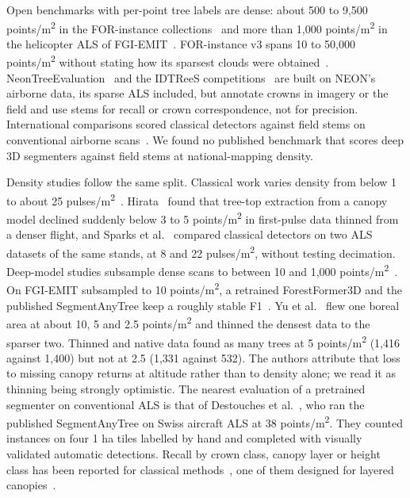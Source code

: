 \documentclass[journal]{IEEEtran}
\begin{document}
Open benchmarks with per-point tree labels are dense: about 500 to 9,500
points/m\textsuperscript{2} in the FOR-instance collections~\cite{puliti2023forinstance} and more than
1,000 points/m\textsuperscript{2} in the helicopter ALS of FGI-EMIT~\cite{ruoppa2026benchmarking}.
FOR-instance v3 spans 10 to 50,000 points/m\textsuperscript{2} without stating how its sparsest
clouds were obtained~\cite{wielgosz2026segmentanytreev2}. NeonTreeEvaluation~\cite{weinstein2021benchmark} and the IDTReeS competitions~\cite{marconi2019data,graves2023data} are built on NEON's airborne data, its sparse ALS included, but
annotate crowns in imagery or the field and use stems for recall or crown
correspondence, not for precision. International comparisons scored classical
detectors against field stems on conventional airborne scans~\cite{kaartinen2012international,vauhkonen2012comparative,eysn2015benchmark,wang2016international}. We found no published benchmark that scores deep 3D
segmenters against field stems at national-mapping density.

Density studies follow the same split. Classical work varies density from below
1 to about 25 pulses/m\textsuperscript{2}~\cite{hirata2004effects,jakubowski2013tradeoffs,kaartinen2012international,sparks2022crosscomparison}. Hirata~\cite{hirata2004effects}
found that tree-top extraction from a canopy model declined suddenly below 3 to
5 points/m\textsuperscript{2} in first-pulse data thinned from a denser flight, and
Sparks et al.~\cite{sparks2022crosscomparison} compared classical detectors on two ALS datasets of
the same stands, at 8 and 22 pulses/m\textsuperscript{2}, without testing decimation. Deep-model
studies subsample dense scans to between 10 and 1,000 points/m\textsuperscript{2}~\cite{wielgosz2024segmentanytree,xiang2025forestformer3d}. On FGI-EMIT subsampled
to 10 points/m\textsuperscript{2}, a retrained ForestFormer3D and the published SegmentAnyTree
keep a roughly stable F1~\cite{ruoppa2026benchmarking}. Yu et al.~\cite{yu2004effects} flew one
boreal area at about 10, 5 and 2.5 points/m\textsuperscript{2} and thinned the densest data to the
sparser two. Thinned and native data found as many trees at 5 points/m\textsuperscript{2} (1,416
against 1,400) but not at 2.5 (1,331 against 532). The authors attribute that
loss to missing canopy returns at altitude rather than to density alone; we read
it as thinning being strongly optimistic. The nearest evaluation of a pretrained
segmenter on conventional ALS is that of Destouches et al.~\cite{destouches2026weaklysupervised}, who
ran the published SegmentAnyTree on Swiss aircraft ALS at 38 points/m\textsuperscript{2}. They
counted instances on four 1 ha tiles labelled by hand and completed with
visually validated automatic detections. Recall by crown class, canopy layer or
height class has been reported for classical methods~\cite{wang2016international,hamraz2017forest,cao2023benchmarking}, one of them designed for layered
canopies~\cite{hamraz2017forest}.
\end{document}

